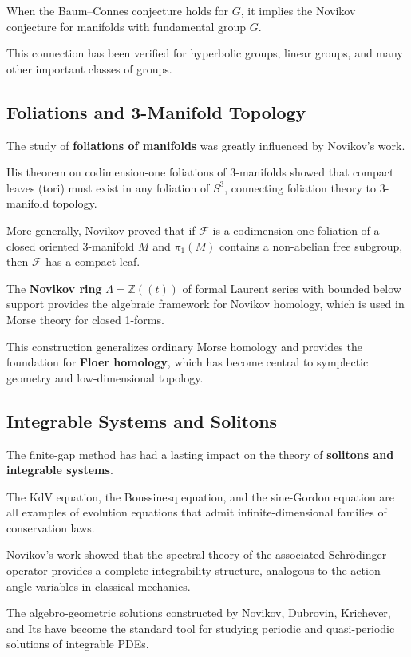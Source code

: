 When the Baum--Connes conjecture holds for $G$, it implies the Novikov conjecture for manifolds with fundamental group $G$.

This connection has been verified for hyperbolic groups, linear groups, and many other important classes of groups.

\subsection*{Foliations and 3-Manifold Topology}

The study of \textbf{foliations of manifolds} was greatly influenced by Novikov's work.

His theorem on codimension-one foliations of 3-manifolds showed that compact leaves (tori) must exist in any foliation of $S^3$, connecting foliation theory to 3-manifold topology.

More generally, Novikov proved that if $\mathcal{F}$ is a codimension-one foliation of a closed oriented 3-manifold $M$ and $\pi_1(M)$ contains a non-abelian free subgroup, then $\mathcal{F}$ has a compact leaf.

The \textbf{Novikov ring} $\Lambda = \mathbb{Z}((t))$ of formal Laurent series with bounded below support provides the algebraic framework for Novikov homology, which is used in Morse theory for closed 1-forms.

This construction generalizes ordinary Morse homology and provides the foundation for \textbf{Floer homology}, which has become central to symplectic geometry and low-dimensional topology.

\subsection*{Integrable Systems and Solitons}

The finite-gap method has had a lasting impact on the theory of \textbf{solitons and integrable systems}.

The KdV equation, the Boussinesq equation, and the sine-Gordon equation are all examples of evolution equations that admit infinite-dimensional families of conservation laws.

Novikov's work showed that the spectral theory of the associated Schrödinger operator provides a complete integrability structure, analogous to the action-angle variables in classical mechanics.

The algebro-geometric solutions constructed by Novikov, Dubrovin, Krichever, and Its have become the standard tool for studying periodic and quasi-periodic solutions of integrable PDEs.

